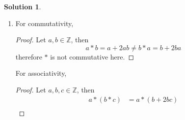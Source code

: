 \documentclass[10pt]{article}
\theoremstyle{definition}
\newtheorem{soln}{Solution}
\newcommand{\justif}[2]{&{#1}&\text{#2}}
\begin{document}
\begin{soln}
\begin{enumerate}[label=(\alph*)]
\begin{proof}
            \begin{align*}
              a*b & = a+b-ab                                                             \\
                  & =b+a-ba \justif{\quad}{Commutativity of $+$ and $-$ on $\mathbb{Z}$} \\
                  & =b*a\justif{\quad}{Definition of $*$}\qedhere
            \end{align*}
          \end{proof}
          For associativity,
          \begin{proof}
            Let $a,b,c\in\mathbb{Z}$, then
            \begin{align*}
              a*(b*c) & = a*(b+c-bc)                                                                 \\
                      & = a + b+c-bc + a(b+c-bc)                                                     \\
                      & = a + b+c-bc + ab+ac-abc\justif{\quad}{$\cdot$ distributive on $\mathbb{Z}$} \\
            \end{align*}
            and
            \begin{align*}
              (a*b)*c & = (a+b-ab)*c                                                                  \\
                      & = a+b-ab + c + (a+b-ab)c                                                      \\
                      & = a+b-ab + c + ac+bc-abc \justif{\quad}{$\cdot$ distributive on $\mathbb{Z}$} \\
            \end{align*}
            because of the difference in sign on the $ab$ terms these two cannot be made to be equal, therefore $*$ is not associative. \qedhere
          \end{proof}
    \item For commutativity,
          \begin{proof}
            Let $a,b\in\mathbb{Z}$, then
            $$
              a*b = a+2ab\neq
              b*a = b+2ba
            $$
            therefore $*$ is not commutative here. \qedhere
          \end{proof}
          For associativity,
          \begin{proof}
            Let $a,b,c\in\mathbb{Z}$, then
            \begin{align*}
              a*(b*c) & = a*(b+2bc)                                                       \\

\end{align*}
\end{proof}
\end{enumerate}
\end{soln}
\end{document}
